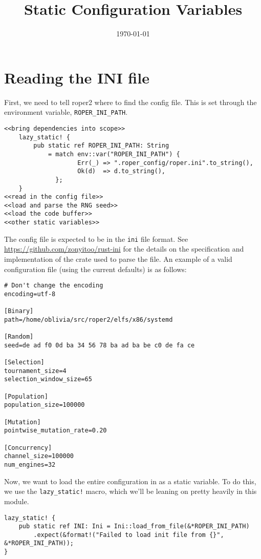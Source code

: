\documentclass[11pt]{article}
\date{\today}
\title{Static Configuration Variables}
\begin{document}
\maketitle
\tableofcontents


\section{Reading the INI file}
\label{sec:org2bd9f34}

First, we need to tell \gls{roper2} where to find the config file. This is
set through the environment variable, \texttt{ROPER\_INI\_PATH}.
\lstset{language=rust,label= ,caption= ,captionpos=b,numbers=none}
\begin{lstlisting}
<<bring dependencies into scope>>
    lazy_static! {
        pub static ref ROPER_INI_PATH: String
            = match env::var("ROPER_INI_PATH") {
                    Err(_) => ".roper_config/roper.ini".to_string(),
                    Ok(d)  => d.to_string(),
              };
    }
<<read in the config file>>
<<load and parse the RNG seed>>
<<load the code buffer>>
<<other static variables>>
\end{lstlisting}

The config file is expected to be in the \texttt{ini} file format. See 
\url{https://github.com/zonyitoo/rust-ini} for the details on the specification
and implementation of the crate used to parse the file. An example of a 
valid configuration file (using the current defaults) is as follows:

\begin{verbatim}
# Don't change the encoding
encoding=utf-8

[Binary]
path=/home/oblivia/src/roper2/elfs/x86/systemd

[Random]
seed=de ad f0 0d ba 34 56 78 ba ad ba be c0 de fa ce

[Selection]
tournament_size=4
selection_window_size=65

[Population]
population_size=100000

[Mutation]
pointwise_mutation_rate=0.20

[Concurrency]
channel_size=100000
num_engines=32
\end{verbatim}

Now, we want to load the entire configuration in as a static variable.
To do this, we use the \texttt{lazy\_static!} macro, which we'll be leaning on
pretty heavily in this module. 

\lstset{language=rust,label=org029777f,caption= ,captionpos=b,numbers=none}
\begin{lstlisting}
lazy_static! {
    pub static ref INI: Ini = Ini::load_from_file(&*ROPER_INI_PATH)
        .expect(&format!("Failed to load init file from {}", &*ROPER_INI_PATH));
}
\end{lstlisting}
\end{document}

